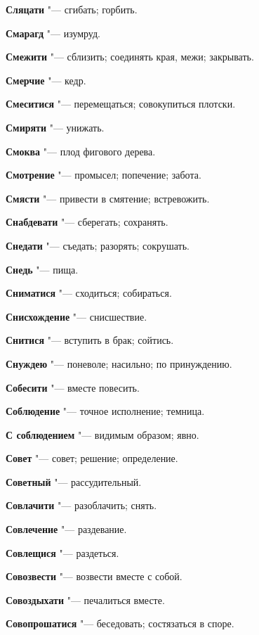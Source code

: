 \begin{mymulticols}
\noindent\textbf{Сляцати} "--- сгибать; горбить. 

\noindent\textbf{Смарагд} "--- изумруд. 

\noindent\textbf{Смежити} "--- сблизить; соединять края, межи; закрывать. 

\noindent\textbf{Смерчие} "--- кедр. 

\noindent\textbf{Смеситися} "--- перемещаться; совокупиться плотски. 

\noindent\textbf{Смиряти} "--- унижать. 

\noindent\textbf{Смоква} "--- плод фигового дерева. 

\noindent\textbf{Смотрение} "--- промысел; попечение; забота. 

\noindent\textbf{Смясти} "--- привести в смятение; встревожить. 

\noindent\textbf{Снабдевати} "--- сберегать; сохранять. 

\noindent\textbf{Снедати} "--- съедать; разорять; сокрушать. 

\noindent\textbf{Снедь} "--- пища. 

\noindent\textbf{Сниматися} "--- сходиться; собираться. 

\noindent\textbf{Снисхождение} "--- снисшествие. 

\noindent\textbf{Снитися} "--- вступить в брак; сойтись. 

\noindent\textbf{Снуждею} "--- поневоле; насильно; по принуждению. 

\noindent\textbf{Собесити} "--- вместе повесить. 

\noindent\textbf{Соблюдение} "--- точное исполнение; темница. 

\noindent\textbf{С соблюдением} "--- видимым образом; явно. 

\noindent\textbf{Совет} "--- совет; решение; определение. 

\noindent\textbf{Советный} "--- рассудительный. 

\noindent\textbf{Совлачити} "--- разоблачить; снять. 

\noindent\textbf{Совлечение} "--- раздевание. 

\noindent\textbf{Совлещися} "--- раздеться. 

\noindent\textbf{Совозвести} "--- возвести вместе с собой. 

\noindent\textbf{Совоздыхати} "--- печалиться вместе. 

\noindent\textbf{Совопрошатися} "--- беседовать; состязаться в споре. 


\end{mymulticols}
